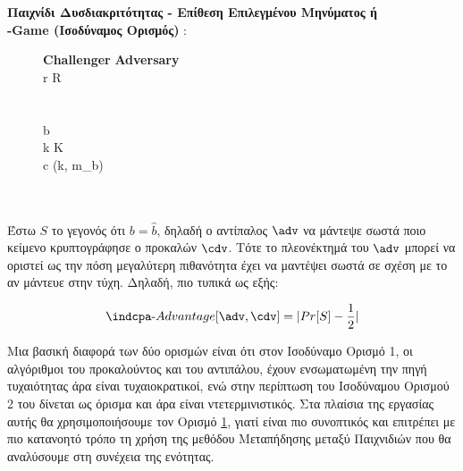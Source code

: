 \begin{definition}
\textbf{Παιχνίδι Δυσδιακριτότητας - Επίθεση Επιλεγμένου Μηνύματος ή \\ \indcpa-Game (Ισοδύναμος Ορισμός)} :
\begin{figure}[H]
\begin{pchstack}
     {
    \textbf{Challenger \cdv} \< \< \textbf{Adversary \adv} \\
    r \sample R \< \< \\
    \<  \< \\
    \<  \< \\
    b \sample \bin \< \< \\
    k \sample K \< \< \\
    c \sample \enc(k, m_b) \< \< \\
    \<  \< \\
    \< \\
    }
\end{pchstack}
\label{def:indcpa_game_2}
\end{figure}

Έστω $S$ το γεγονός ότι $b = \hat{b}$, δηλαδή ο αντίπαλος $\adv$ να μάντεψε σωστά ποιο κείμενο κρυπτογράφησε ο προκαλών $\cdv$. Τότε το πλεονέκτημά του $\adv$ μπορεί να οριστεί ως την πόση μεγαλύτερη πιθανότητα έχει να μαντέψει σωστά σε σχέση με το αν μάντευε στην τύχη. Δηλαδή, πιο τυπικά ως εξής: 

\begin{equation}
    \indcpa\text{-}Advantage[\adv, \cdv] = | Pr[S] - \dfrac{1}{2} |
\end{equation}
\end{definition}


Μια βασική διαφορά των δύο ορισμών είναι ότι στον Ισοδύναμο Ορισμό 1, οι αλγόριθμοι του προκαλούντος και του αντιπάλου, έχουν ενσωματωμένη την πηγή τυχαιότητας άρα είναι τυχαιοκρατικοί, ενώ στην περίπτωση του Ισοδύναμου Ορισμού 2 του δίνεται ως όρισμα και άρα είναι ντετερμινιστικός. Στα πλαίσια της εργασίας αυτής θα χρησιμοποιήσουμε τον Ορισμό \ref{def:indcpa_game_2}, γιατί είναι πιο συνοπτικός και επιτρέπει με πιο κατανοητό τρόπο τη χρήση της μεθόδου Μεταπήδησης μεταξύ Παιχνιδιών που θα αναλύσουμε στη συνέχεια της ενότητας.

